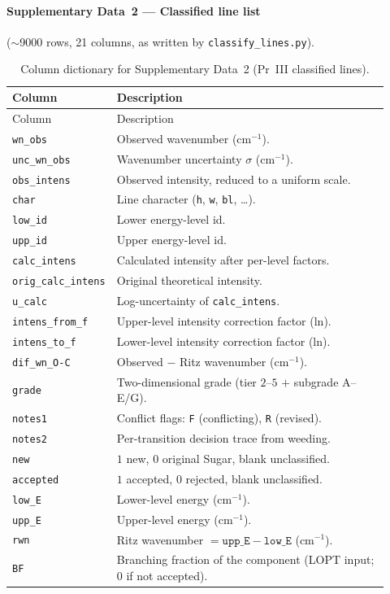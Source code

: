 \documentclass[10pt]{article}
\begin{document}
\paragraph{Supplementary Data~2 --- Classified line list} ($\sim$9000 rows,
21 columns, as written by \texttt{classify\_lines.py}).

\begin{longtable}{@{}p{0.20\linewidth} p{0.72\linewidth}@{}}
\caption{Column dictionary for Supplementary Data~2 (Pr~III classified lines).}
\label{tab:lines_dict}\\
\toprule
Column & Description \\
\midrule
\endfirsthead
\toprule Column & Description \\ \midrule \endhead
\bottomrule \endfoot
\texttt{wn\_obs}           & Observed wavenumber (cm$^{-1}$). \\
\texttt{unc\_wn\_obs}      & Wavenumber uncertainty $\sigma$ (cm$^{-1}$). \\
\texttt{obs\_intens}       & Observed intensity, reduced to a uniform scale. \\
\texttt{char}              & Line character (\texttt{h}, \texttt{w}, \texttt{bl}, \ldots). \\
\texttt{low\_id}           & Lower energy-level id. \\
\texttt{upp\_id}           & Upper energy-level id. \\
\texttt{calc\_intens}      & Calculated intensity after per-level factors. \\
\texttt{orig\_calc\_intens}& Original theoretical intensity. \\
\texttt{u\_calc}           & Log-uncertainty of \texttt{calc\_intens}. \\
\texttt{intens\_from\_f}   & Upper-level intensity correction factor (ln). \\
\texttt{intens\_to\_f}     & Lower-level intensity correction factor (ln). \\
\texttt{dif\_wn\_O-C}      & Observed $-$ Ritz wavenumber (cm$^{-1}$). \\
\texttt{grade}             & Two-dimensional grade (tier $2$--$5$ $+$ subgrade A--E/G). \\
\texttt{notes1}            & Conflict flags: \texttt{F} (conflicting), \texttt{R} (revised). \\
\texttt{notes2}            & Per-transition decision trace from weeding. \\
\texttt{new}               & $1$ new, $0$ original Sugar, blank unclassified. \\
\texttt{accepted}          & $1$ accepted, $0$ rejected, blank unclassified. \\
\texttt{low\_E}            & Lower-level energy (cm$^{-1}$). \\
\texttt{upp\_E}            & Upper-level energy (cm$^{-1}$). \\
\texttt{rwn}               & Ritz wavenumber $=\texttt{upp\_E}-\texttt{low\_E}$ (cm$^{-1}$). \\
\texttt{BF}                & Branching fraction of the component (LOPT input; $0$ if not accepted). \\
\end{longtable}
\end{document}
